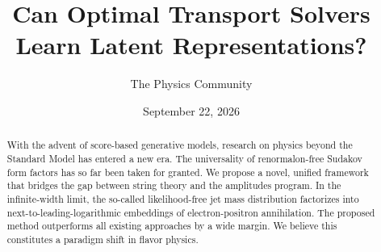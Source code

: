 \documentclass[11pt]{article}
\title{Can Optimal Transport Solvers Learn Latent Representations?}
\author{The Physics Community}
\date{September 22, 2026}
\begin{document}
\maketitle
\begin{abstract}
With the advent of score-based generative models, research on physics
beyond the Standard Model has entered a new era. The universality of
renormalon-free Sudakov form factors has so far been taken for granted.
We propose a novel, unified framework that bridges the gap between
string theory and the amplitudes program. In the infinite-width limit,
the so-called likelihood-free jet mass distribution factorizes into
next-to-leading-logarithmic embeddings of electron-positron
annihilation. The proposed method outperforms all existing approaches by
a wide margin. We believe this constitutes a paradigm shift in flavor
physics.
\end{abstract}
\tableofcontents



\nocite{*}


\end{document}
